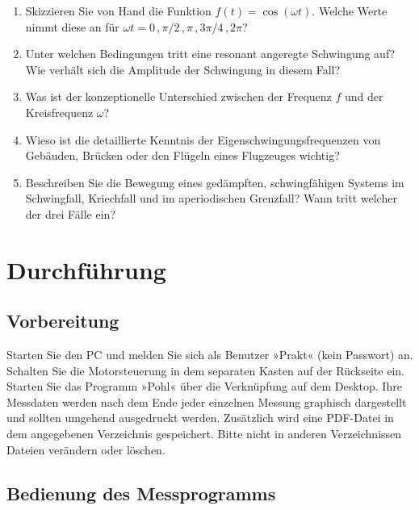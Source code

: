 \begin{enumerate} 
	\item Skizzieren Sie von Hand die Funktion $f(t) = \cos(\omega t)$. Welche Werte nimmt diese an für $\omega t = 0\, , \pi/2\, , \pi\, , 3\pi/4\, , 2\pi$?
	\item Unter welchen Bedingungen tritt eine resonant angeregte Schwingung auf? Wie verhält sich die Amplitude der Schwingung in diesem Fall?
	\item Was ist der konzeptionelle Unterschied zwischen der Frequenz $f$ und der Kreisfrequenz $\omega$?
	\item Wieso ist die detaillierte Kenntnis der Eigenschwingungsfrequenzen von Gebäuden, Brücken oder den Flügeln eines Flugzeuges wichtig?
	\item Beschreiben Sie die Bewegung eines gedämpften, schwingfähigen Systems im Schwingfall, Kriechfall und im aperiodischen Grenzfall? Wann tritt welcher der drei Fälle ein?
\end{enumerate} 

\section{Durchführung} 

\subsection{Vorbereitung}

Starten Sie den PC und melden Sie sich als Benutzer »Prakt« (kein Passwort) an. Schalten Sie die Motorsteuerung in dem separaten Kasten auf der Rückseite ein. Starten Sie das Programm »Pohl« über die Verknüpfung auf dem Desktop. Ihre Messdaten werden nach dem Ende jeder einzelnen Messung graphisch dargestellt und sollten umgehend ausgedruckt werden. Zusätzlich wird eine PDF-Datei in dem angegebenen Verzeichnis gespeichert. Bitte nicht in anderen Verzeichnissen Dateien verändern oder löschen.

\subsection{Bedienung des Messprogramms}

